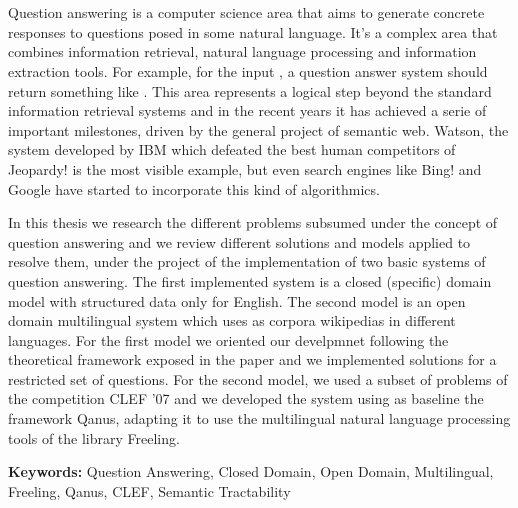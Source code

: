 \chapter*{\runtitle}
Question answering is a computer science area that aims to generate concrete responses to questions posed in some natural language. It's a complex area that combines information retrieval, natural language processing and information extraction tools. For example, for the input \textit{}, a question answer system should return something like .
This area represents a logical step beyond the standard information retrieval systems and in the recent years it has achieved a serie of important milestones, driven by the general project of semantic web. Watson, the system developed by IBM which defeated the best human competitors of Jeopardy! is the most visible example, but even search engines like Bing! and Google have started to incorporate this kind of algorithmics.

In this thesis we research the different problems subsumed under the concept of question answering and we review different solutions and models applied to resolve them, under the project of the implementation of two basic systems of question answering. The first implemented system is a closed (specific) domain model with structured data only for English. The second model is an open domain multilingual system which uses as corpora wikipedias in different languages. For the first model we oriented our develpmnet following the theoretical framework exposed in the paper \cite{QADB1} and we implemented solutions for a restricted set of questions. For the second model, we used a subset of problems of the competition CLEF '07 and we developed the system using as baseline the framework Qanus, adapting it to use the multilingual natural language processing tools of the library Freeling.
\bigskip

\noindent\textbf{Keywords:} Question Answering, Closed Domain, Open Domain, Multilingual, Freeling, Qanus, CLEF, Semantic Tractability